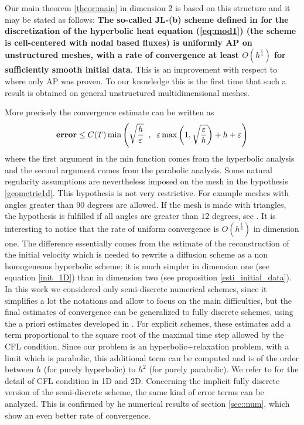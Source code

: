 \documentclass[a4paper,french,english,10pt]{article}
\newcommand\eps{\varepsilon}
\newcommand\V{\mathbf{V}}
\begin{document}
Our main theorem \ref{theor:main} in dimension 2
is based on this structure and it may be stated as follows:
{\bf The so-called JL-(b) scheme defined
in \cite{glaceap} for the discretization of the hyperbolic heat equation 
(\ref{eq:mod1}) (the scheme  is cell-centered with nodal based fluxes)
 is uniformly AP on unstructured meshes, with a rate
of convergence at least $O(h^\frac14)$ for sufficiently smooth initial data}.
This is an improvement with respect to \cite{glaceap} where only AP was proven.
To our knowledge this is the first time that such a result is obtained on general unstructured
multidimensional meshes. 


More precisely the convergence estimate can be written as 
$$
\mbox{\bf error}
\leq
C(T) \min \left(
\sqrt{\frac h \eps  } \; \; , \; \;
\eps \max\left(1, \sqrt{\frac \eps h } \right) +
h + 
\eps
\right)
$$
where  the first argument in the min function comes from the hyperbolic analysis 
and the second argument comes from the parabolic analysis. 
Some natural regularity 
assumptions 
 are  nevertheless 
imposed on the mesh in the hypothesis \ref{geometrie1d}.
This hypothesis is not very restrictive. For example
 meshes with angles greater
than $90$ degrees are allowed. If the mesh is made with triangles,
the hypothesis is fulfilled if all angles are greater
than $12$ degrees, see \cite{glaceap}.
It is interesting to notice that
the rate of uniform 
convergence is $O(h^\frac13)$ 
in dimension one. 
The difference essentially comes from the 
estimate of the reconstruction of the initial velocity which is needed
to rewrite a diffusion scheme as a non homogeneous hyperbolic scheme:
it is much simpler in dimension one (see equation \eqref{init_1D}) than in 
dimension two (see proposition \eqref{esti_initial_data}).
In this work we considered only semi-discrete numerical schemes, since it simplifies
a lot the notations and allow to focus on the main difficulties,
but the final estimates of convergence can be generalized to fully discrete schemes, using the a priori
estimates developed in \cite{de04}. 
For explicit schemes,
these estimates add a term proportional to the square root of the maximal time step allowed by the CFL
condition. Since our problem is an hyperbolic+relaxation problem, with a limit which is parabolic,
this additional term can be computed and is of the order between $h$ (for purely hyperbolic)
to $h^2$ (for purely parabolic). We refer to  \cite{glaceap} for the detail of CFL condition in 1D and 2D.
Concerning the implicit fully discrete version of the semi-discrete scheme, the same kind
of error terms  can be analyzed. This is confirmed by he numerical results of section \ref{sec::num}, 
which show an even better rate of convergence.
\end{document}
